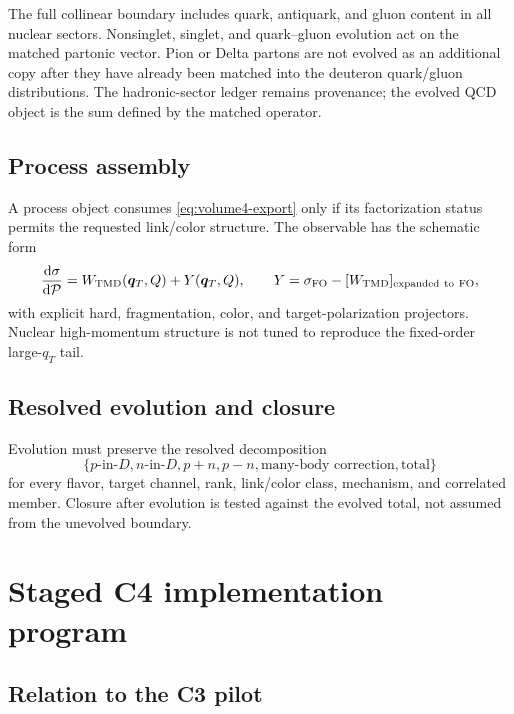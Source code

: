 \documentclass[11pt]{article}
\newcommand{\qT}{\bm{q}_{T}}
\newcommand{\dd}{\mathrm{d}}
\begin{document}
The full collinear boundary includes quark, antiquark, and gluon content in
all nuclear sectors.  Nonsinglet, singlet, and quark--gluon evolution act on
the matched partonic vector.  Pion or Delta partons are not evolved as an
additional copy after they have already been matched into the deuteron
quark/gluon distributions.  The hadronic-sector ledger remains provenance;
the evolved QCD object is the sum defined by the matched operator.

\subsection{Process assembly}

A process object consumes \cref{eq:volume4-export} only if its factorization
status permits the requested link/color structure.  The observable has the
schematic form
\begin{equation}
 \frac{\dd\sigma}{\dd\mathcal P}
 =W_{\rm TMD}(\qT,Q)
 +Y(\qT,Q),
 \qquad
 Y=\sigma_{\rm FO}-[W_{\rm TMD}]_{\rm expanded\ to\ FO},
\label{eq:volume5-wy-contract}
\end{equation}
with explicit hard, fragmentation, color, and target-polarization projectors.
Nuclear high-momentum structure is not tuned to reproduce the fixed-order
large-\(q_T\) tail.

\subsection{Resolved evolution and closure}

Evolution must preserve the resolved decomposition
\begin{equation}
 \{
 p\text{-in-}D,
 n\text{-in-}D,
 p+n,
 p-n,
 \text{many-body correction},
 \text{total}
 \}
\label{eq:resolved-evolution-components}
\end{equation}
for every flavor, target channel, rank, link/color class, mechanism, and
correlated member.  Closure after evolution is tested against the evolved
total, not assumed from the unevolved boundary.

\section{Staged C4 implementation program}
\label{sec:c4-program}

\subsection{Relation to the C3 pilot}
\end{document}
